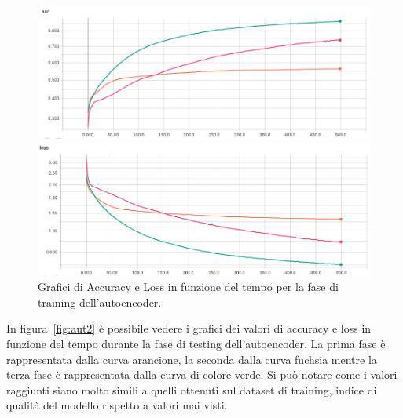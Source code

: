 \begin{figure}[!bp]
    \centering
    \begin{minipage}[t]{\linewidth}
    	\includegraphics[width=\linewidth]{figures/autoenc.png}
    \end{minipage}\hfill
    \begin{minipage}[b]{\linewidth}
    	\includegraphics[width=\linewidth]{figures/autoenc2.png}
    \end{minipage}
    \caption{Grafici di Accuracy e Loss in funzione del tempo per la fase di training dell'autoencoder. \label{fig:aut1}}
\end{figure}

In figura~\ref{fig:aut2} è possibile vedere i grafici dei valori di accuracy e loss in funzione del tempo durante la fase di testing dell'autoencoder.  La prima fase è rappresentata dalla curva arancione, la seconda dalla curva fuchsia mentre la terza fase è rappresentata dalla curva di colore verde. Si può notare come i valori raggiunti siano molto simili a quelli ottenuti sul dataset di training, indice di qualità del modello rispetto a valori mai visti.


